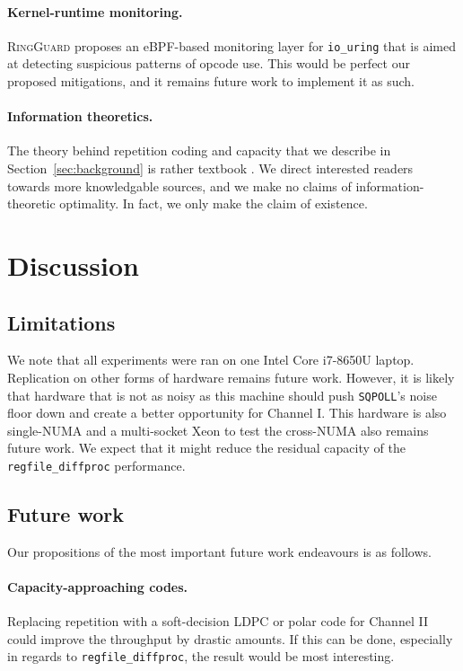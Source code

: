 \documentclass[letterpaper,twocolumn,10pt]{article}
\newcommand{\code}[1]{\texttt{#1}}
\newcommand{\iouring}{\texttt{io\_uring}\xspace}
\begin{document}
\paragraph{Kernel-runtime monitoring.} \textsc{RingGuard} \cite{he2023ringguard} proposes an eBPF-based monitoring layer for \iouring that is aimed at detecting suspicious patterns of opcode use. This would be perfect our proposed mitigations, and it remains future work to implement it as such.

\paragraph{Information theoretics.} The theory behind repetition coding and capacity that we describe in Section~\ref{sec:background} is rather textbook \cite{shannon1948mathematical, cover2006elements}. We direct interested readers towards more knowledgable sources, and we make no claims of information-theoretic optimality. In fact, we only make the claim of existence.

\section{Discussion}
\subsection{Limitations}
We note that all experiments were ran on one Intel Core i7-8650U laptop. Replication on other forms of hardware remains future work. However, it is likely that hardware that is not as noisy as this machine should push \code{SQPOLL}'s noise floor down and create a better opportunity for Channel I. This hardware is also single-NUMA and a multi-socket Xeon to test the cross-NUMA also remains future work. We expect that it might reduce the residual capacity of the \code{regfile\_diffproc} performance.

\subsection{Future work}
Our propositions of the most important future work endeavours is as follows.

\paragraph{Capacity-approaching codes.} Replacing repetition with a soft-decision LDPC or polar code for Channel II could improve the throughput by drastic amounts. If this can be done, especially in regards to \code{regfile\_diffproc}, the result would be most interesting.
\end{document}
